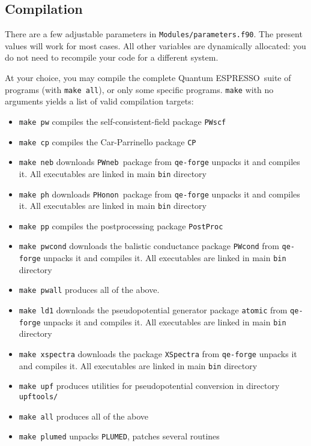 \documentclass[12pt,a4paper]{article}
\def\qe{{\sc Quantum ESPRESSO}}
\def\PWscf{\texttt{PWscf}}
\def\PHonon{\texttt{PHonon}}
\def\CP{\texttt{CP}}
\def\PostProc{\texttt{PostProc}}
\def\NEB{\texttt{PWneb}} %
\begin{document}
\subsection{Compilation}
\label{SubSec:Compilation}

There are a few adjustable parameters in \texttt{Modules/parameters.f90}. 
The
present values will work for most cases. All other variables are dynamically
allocated: you do not need to recompile your code for a different system.
    
At your choice, you may compile the complete \qe\ suite of programs 
(with \texttt{make all}), or only some specific programs. \texttt{make} with no arguments yields a list of valid compilation targets:
\begin{itemize}
\item \texttt{make pw}  compiles the self-consistent-field package \PWscf
\item \texttt{make cp}  compiles the Car-Parrinello package \CP
\item \texttt{make neb} downloads \NEB\ package from \texttt{qe-forge}
			unpacks it and compiles it. All executables are linked
			in main \texttt{bin} directory
\item \texttt{make ph}  downloads \PHonon\ package from \texttt{qe-forge}
			unpacks it and compiles it. All executables are linked
			in main \texttt{bin} directory
\item \texttt{make pp}  compiles the postprocessing package \PostProc
\item \texttt{make pwcond} downloads the balistic conductance package \texttt{PWcond}
			from \texttt{qe-forge}
			unpacks it and compiles it. All executables are linked
			in main \texttt{bin} directory
\item \texttt{make pwall} produces all of the above.
\item \texttt{make ld1}  downloads the pseudopotential generator package \texttt{atomic} 
			from \texttt{qe-forge}
			unpacks it and compiles it. All executables are linked
			in main \texttt{bin} directory
\item \texttt{make xspectra} downloads the package \texttt{XSpectra} 
			from \texttt{qe-forge}
			unpacks it and compiles it. All executables are linked
			in main \texttt{bin} directory
\item \texttt{make upf} produces utilities for pseudopotential conversion in
                        directory \texttt{upftools/}
\item \texttt{make all} produces all of the above
\item \texttt{make plumed} unpacks \texttt{PLUMED}, patches several routines

\end{itemize}
\end{document}
